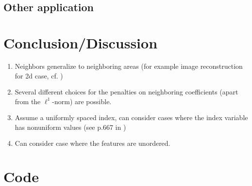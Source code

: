 \documentclass{article}
\theoremstyle{definition}
\begin{document}
\subsection{Other application}

\section{Conclusion/Discussion}

\begin{enumerate}
	\item Neighbors generalize to neighboring areas  (for example image reconstruction for 2d case, cf. \citep{sparsity})
	\item Several different choices for the penalties on neighboring coefficients (apart from the $\ell^1$-norm) are possible.
	\item Assume a uniformly spaced index, can consider cases where the index variable has nonuniform values (see p.667 in \citep{sparsity})
	\item Can consider case where the features are unordered.
\end{enumerate}
 
 \citep{elements}

\appendix

\newpage

\section{Code}
\end{document}
